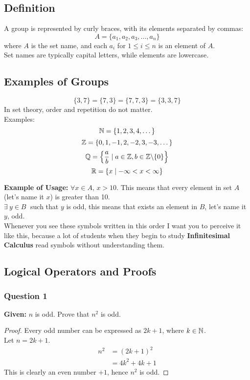 \subsection{Definition}
A group is represented by curly braces, with its elements separated by commas: 
\[
A = \{a_1,a_2,a_3,\dots,a_n\}
\]
where $A$ is the set name, and each $a_i$ for $1 \leq i \leq n$ is an element of $A$.\\
Set names are typically capital letters, while elements are lowercase.

\subsection{Examples of Groups}
\[
\{3,7\} = \{7,3\} = \{7,7,3\} = \{3,3,7\}
\]
In set theory, order and repetition do not matter.\\
Examples:
\[
\mathbb{N} = \{1, 2, 3, 4, \dots\}
\]
\[
\mathbb{Z} = \{0, 1, -1, 2, -2, 3, -3, \dots\}
\]
\[
\mathbb{Q} = \left\{ \frac{a}{b} \mid a \in \mathbb{Z}, b \in \mathbb{Z} \backslash \{0\} \right\}
\]
\[
\mathbb{R} = \left\{ x \mid -\infty < x < \infty \right\}
\]
\newpage

\noindent \textbf{Example of Usage:}  
$\forall x \in A$, $x > 10$.  
This means that every element in set $A$ (let's name it $x$) is greater than 10.\\
$\exists\: y\in B \;$ such that $y$ is odd, this means that exists an element in $B$, let's name it $y$, odd.\\
Whenever you see these symbols written in this order I want you to perceive it like this, because a lot of students when they begin to study \textbf{Infinitesimal Calculus} read symbols without understanding them.

\subsection{Logical Operators and Proofs}

\subsubsection{Question 1}
\textbf{Given:} $n$ is odd. Prove that $n^2$ is odd.

\begin{proof}
Every odd number can be expressed as $2k + 1$, where $k \in \mathbb{N}$.\\
Let $n = 2k + 1$.
\begin{align*}
    n^2 &= (2k + 1)^2 \\
        &= 4k^2 + 4k + 1
\end{align*}
This is clearly an even number $+ 1$, hence $n^2$ is odd.
\end{proof}


